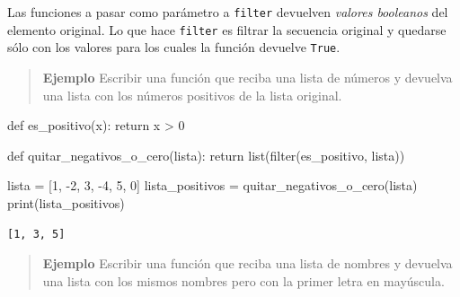 \documentclass[
  letterpaper,
  DIV=11,
  numbers=noendperiod]{scrreprt}
\newenvironment{Shaded}{\begin{snugshade}}{\end{snugshade}}
\newcommand{\BuiltInTok}[1]{\textcolor[rgb]{0.00,0.23,0.31}{#1}}
\newcommand{\ControlFlowTok}[1]{\textcolor[rgb]{0.00,0.23,0.31}{#1}}
\newcommand{\DecValTok}[1]{\textcolor[rgb]{0.68,0.00,0.00}{#1}}
\newcommand{\KeywordTok}[1]{\textcolor[rgb]{0.00,0.23,0.31}{#1}}
\newcommand{\NormalTok}[1]{\textcolor[rgb]{0.00,0.23,0.31}{#1}}
\newcommand{\OperatorTok}[1]{\textcolor[rgb]{0.37,0.37,0.37}{#1}}
\begin{document}
\begin{tcolorbox}[enhanced jigsaw, bottomrule=.15mm, leftrule=.75mm, opacityback=0, colback=white, toprule=.15mm, bottomtitle=1mm, opacitybacktitle=0.6, rightrule=.15mm, left=2mm, arc=.35mm, coltitle=black, title=\textcolor{quarto-callout-tip-color}{\faLightbulb}\hspace{0.5em}{Tip}, breakable, toptitle=1mm, colframe=quarto-callout-tip-color-frame, titlerule=0mm, colbacktitle=quarto-callout-tip-color!10!white]

Las funciones a pasar como parámetro a \texttt{filter} devuelven
\emph{valores booleanos} del elemento original. Lo que hace
\texttt{filter} es filtrar la secuencia original y quedarse sólo con los
valores para los cuales la función devuelve \texttt{True}.

\end{tcolorbox}

\begin{quote}
\textbf{Ejemplo} Escribir una función que reciba una lista de números y
devuelva una lista con los números positivos de la lista original.
\end{quote}

\begin{Shaded}
\begin{Highlighting}[]
\KeywordTok{def}\NormalTok{ es\_positivo(x):}
  \ControlFlowTok{return}\NormalTok{ x }\OperatorTok{\textgreater{}} \DecValTok{0}

\KeywordTok{def}\NormalTok{ quitar\_negativos\_o\_cero(lista):}
  \ControlFlowTok{return} \BuiltInTok{list}\NormalTok{(}\BuiltInTok{filter}\NormalTok{(es\_positivo, lista))}

\NormalTok{lista }\OperatorTok{=}\NormalTok{ [}\DecValTok{1}\NormalTok{, }\OperatorTok{{-}}\DecValTok{2}\NormalTok{, }\DecValTok{3}\NormalTok{, }\OperatorTok{{-}}\DecValTok{4}\NormalTok{, }\DecValTok{5}\NormalTok{, }\DecValTok{0}\NormalTok{]}
\NormalTok{lista\_positivos }\OperatorTok{=}\NormalTok{ quitar\_negativos\_o\_cero(lista)}
\BuiltInTok{print}\NormalTok{(lista\_positivos)}
\end{Highlighting}
\end{Shaded}

\begin{verbatim}
[1, 3, 5]
\end{verbatim}

\begin{quote}
\textbf{Ejemplo} Escribir una función que reciba una lista de nombres y
devuelva una lista con los mismos nombres pero con la primer letra en
mayúscula.
\end{quote}
\end{document}
